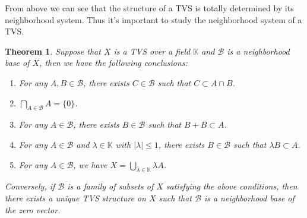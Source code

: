 \documentclass[12pt,a4paper,draft]{article}  %
\newtheorem{theorem}{Theorem}[section]
\theoremstyle{definition}
\numberwithin{equation}{section}
\begin{document}
From above we can see that the structure of a TVS is totally determined by its neighborhood system.
Thus it's important to study the neighborhood system of a TVS.
\begin{theorem} \label{thm3.1}
    Suppose that $X$ is a TVS over a field $\mathbb{K}$ and $\mathcal{B}$ is a neighborhood base of $X$,
    then we have the following conclusions:
    \begin{enumerate}
        \item For any $A,B \in \mathcal{B}$, there exists $C \in \mathcal{B}$ such that $C \subset A \cap B$.
        \item $\bigcap_{A \in \mathcal{B}} A = \{0\}$.
        \item For any $A \in \mathcal{B}$, there exists $B \in \mathcal{B}$ such that $B+B \subset A$.
        \item For any $A \in \mathcal{B}$ and $\lambda \in \mathbb{K}$ with $|\lambda| \leq 1$, there exists $B \in \mathcal{B}$ such that $\lambda B \subset A$.
        \item For any $A \in \mathcal{B}$, we have $X = \bigcup_{\lambda \in \mathbb{K}} \lambda A$.
    \end{enumerate}
    Conversely, if $\mathcal{B}$ is a family of subsets of $X$ satisfying the above conditions, then there exists a unique TVS structure on $X$ such that $\mathcal{B}$ is a neighborhood base of the zero vector.
\end{theorem}
\end{document}
